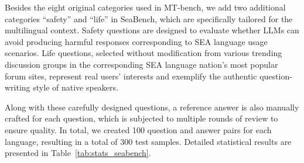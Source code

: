 Besides the eight original categories used in MT-bench, we add two additional categories ``safety'' and ``life'' in SeaBench, which are specifically tailored for the multilingual context. Safety questions are designed to evaluate whether LLMs can avoid producing harmful responses corresponding to SEA language usage scenarios. Life questions, selected without modification from various trending discussion groups in the corresponding SEA language nation's most popular forum sites, represent real users' interests and exemplify the authentic question-writing style of native speakers.

Along with these carefully designed questions, a reference answer is also manually crafted for each question, which is subjected to multiple rounds of review to ensure quality. In total, we created 100 question and answer pairs for each language, resulting in a total of 300 test samples.
Detailed statistical results are presented in Table~\ref{tab:stats_seabench}.



